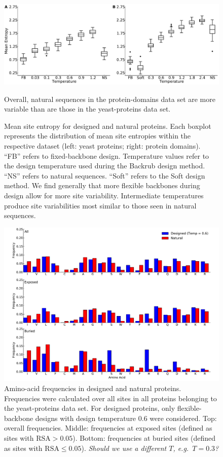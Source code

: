 \documentclass[12pt]{article}
\begin{document}
\begin{figure}[H]
\centerline{\includegraphics[width = 6in]{figures/Mean_Entropy_vs_Temp_Combo_Boxplot.pdf}} %
\caption{Mean site entropy for designed and natural proteins. Each boxplot represents the distribution of mean site entropies within the respective dataset (left: yeast proteins; right: protein domains). ``FB'' refers to fixed-backbone design. Temperature values refer to the design temperature used during the Backrub design method. ``NS'' refers to natural sequences. ``Soft'' refers to the Soft design method. We find generally that more flexible backbones during design allow for more site variability. Intermediate temperatures produce site variabilities most similar to those seen in natural sequences.} Overall, natural sequences in the protein-domains data set are more variable than are those in the yeast-proteins data set.
\label{MeanEntropyComparison}
\end{figure}


\begin{figure}[H]
\centerline{\includegraphics[width = 5in]{figures/Duncan_Freq_Combo_Plots_06.pdf}}
\caption{Amino-acid frequencies in designed and natural proteins. Frequencies were calculated over all sites in all proteins belonging to the yeast-proteins data set. For designed proteins, only flexible-backbone designs with design temperature 0.6 were considered. Top: overall frequencies. Middle: frequencies at exposed sites (defined as sites with $\text{RSA}>0.05$). Bottom: frequencies at buried sites (defined as sites with $\text{RSA}\leq0.05$). {\color{green}\emph{Should we use a different $T$, e.g.\ $T=0.3$?} }  }
\label{AAFreqsYeastProteins}
\end{figure}
\end{document}
